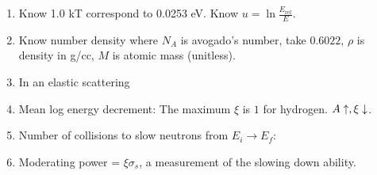 \documentclass{school-22.211-notes}
\date{March 14, 2012}
\begin{document}
\maketitle

\begin{enumerate}
\item Know 1.0 kT correspond to 0.0253 eV. Know $\displaystyle u = \ln \frac{E_{\mathrm{ref}}}{E}$. 

\item Know number density 
  where $N_A$ is  avogado's number, take $0.6022$, $\rho$ is density in g/cc, $M$ is atomic mass (unitless). 

\item In an elastic scattering

\item Mean log energy decrement:
  The maximum $\xi$ is $1$ for hydrogen. $A \uparrow, \xi \downarrow$. 

\item Number of collisions to slow neutrons from $E_i \to E_f$: 

\item Moderating power = $\xi \sigma_s$, a measurement of the slowing down ability. 
\end{enumerate}
\end{document}
